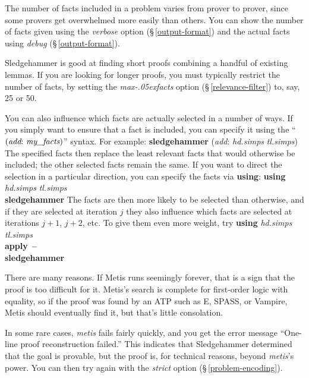 \documentclass[a4paper,12pt]{article}
\let\oldS=\S
\def\S{\oldS\,}
\renewcommand\_{\hbox{\textunderscore\kern-.05ex}}
\begin{document}
The number of facts included in a problem varies from prover to prover, since
some provers get overwhelmed more easily than others. You can show the number of
facts given using the \textit{verbose} option (\S\ref{output-format}) and the
actual facts using \textit{debug} (\S\ref{output-format}).

Sledgehammer is good at finding short proofs combining a handful of existing
lemmas. If you are looking for longer proofs, you must typically restrict the
number of facts, by setting the \textit{max\_facts} option
(\S\ref{relevance-filter}) to, say, 25 or 50.

You can also influence which facts are actually selected in a number of ways. If
you simply want to ensure that a fact is included, you can specify it using the
``$(\textit{add}{:}~\textit{my\_facts})$'' syntax. For example:
%
\prew
\textbf{sledgehammer} (\textit{add}: \textit{hd.simps} \textit{tl.simps})
\postw
%
The specified facts then replace the least relevant facts that would otherwise be
included; the other selected facts remain the same.
If you want to direct the selection in a particular direction, you can specify
the facts via \textbf{using}:
%
\prew
\textbf{using} \textit{hd.simps} \textit{tl.simps} \\
\textbf{sledgehammer}
\postw
%
The facts are then more likely to be selected than otherwise, and if they are
selected at iteration $j$ they also influence which facts are selected at
iterations $j + 1$, $j + 2$, etc. To give them even more weight, try
%
\prew
\textbf{using} \textit{hd.simps} \textit{tl.simps} \\
\textbf{apply}~\textbf{--} \\
\textbf{sledgehammer}
\postw


There are many reasons. If Metis runs seemingly forever, that is a sign that the
proof is too difficult for it. Metis's search is complete for first-order logic
with equality, so if the proof was found by an ATP such as E, SPASS, or Vampire,
Metis should eventually find it, but that's little consolation.

In some rare cases, \textit{metis} fails fairly quickly, and you get the error
message ``One-line proof reconstruction failed.'' This indicates that
Sledgehammer determined that the goal is provable, but the proof is, for
technical reasons, beyond \textit{metis}'s power. You can then try again with
the \textit{strict} option (\S\ref{problem-encoding}).
\end{document}
